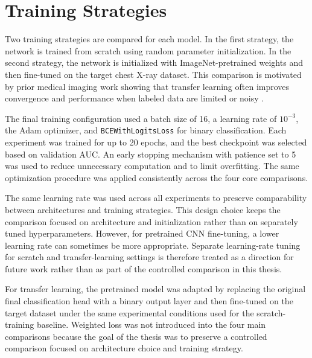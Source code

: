 \section{Training Strategies}
Two training strategies are compared for each model. In the first strategy, the network is trained from scratch using random parameter initialization. In the second strategy, the network is initialized with ImageNet-pretrained weights and then fine-tuned on the target chest X-ray dataset. This comparison is motivated by prior medical imaging work showing that transfer learning often improves convergence and performance when labeled data are limited or noisy \cite{ref:tajbakhsh2016,ref:shin2016}.

The final training configuration used a batch size of 16, a learning rate of $10^{-3}$, the Adam optimizer, and \texttt{BCEWithLogitsLoss} for binary classification. Each experiment was trained for up to 20 epochs, and the best checkpoint was selected based on validation AUC. An early stopping mechanism with patience set to 5 was used to reduce unnecessary computation and to limit overfitting. The same optimization procedure was applied consistently across the four core comparisons.

The same learning rate was used across all experiments to preserve comparability between architectures and training strategies. This design choice keeps the comparison focused on architecture and initialization rather than on separately tuned hyperparameters. However, for pretrained CNN fine-tuning, a lower learning rate can sometimes be more appropriate. Separate learning-rate tuning for scratch and transfer-learning settings is therefore treated as a direction for future work rather than as part of the controlled comparison in this thesis.

For transfer learning, the pretrained model was adapted by replacing the original final classification head with a binary output layer and then fine-tuned on the target dataset under the same experimental conditions used for the scratch-training baseline. Weighted loss was not introduced into the four main comparisons because the goal of the thesis was to preserve a controlled comparison focused on architecture choice and training strategy.

